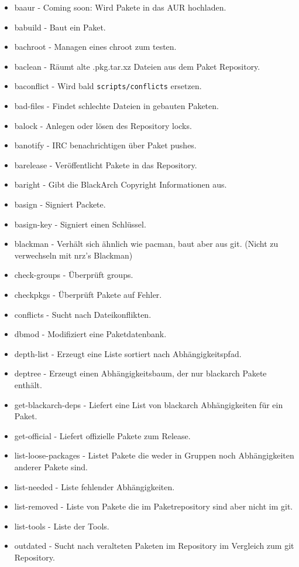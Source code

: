 \documentclass[a4paper, oneside, 11pt]{book}
\begin{document}
\begin{itemize}
\item baaur - Coming soon: Wird Pakete in das AUR hochladen.
\item babuild - Baut ein Paket.
\item bachroot - Managen eines chroot zum testen.
\item baclean - Räumt alte .pkg.tar.xz Dateien aus dem Paket Repository.
\item baconflict - Wird bald \verb|scripts/conflicts| ersetzen.
\item bad-files - Findet schlechte Dateien in gebauten Paketen.
\item balock - Anlegen oder lösen des Repository locks.
\item banotify - IRC benachrichtigen über Paket pushes.
\item barelease - Veröffentlicht Pakete in das Repository.
\item baright - Gibt die BlackArch Copyright Informationen aus.
\item basign - Signiert Packete.
\item basign-key - Signiert einen Schlüssel.
\item blackman - Verhält sich ähnlich wie pacman, baut aber aus git. 
	(Nicht zu verwechseln mit nrz's Blackman)
\item check-groups - Überprüft groups.
\item checkpkgs - Überprüft Pakete auf Fehler.
\item conflicts - Sucht nach Dateikonflikten.
\item dbmod - Modifiziert eine Paketdatenbank.
\item depth-list - Erzeugt eine Liste sortiert nach Abhängigkeitspfad.
\item deptree - Erzeugt einen Abhängigkeitsbaum, der nur blackarch Pakete enthält.
\item get-blackarch-deps - Liefert eine List von blackarch Abhängigkeiten für ein Paket.
\item get-official - Liefert offizielle Pakete zum Release.
\item list-loose-packages - Listet Pakete die weder in Gruppen noch Abhängigkeiten anderer Pakete sind.
\item list-needed - Liste fehlender Abhängigkeiten.
\item list-removed - Liste von Pakete die im Paketrepository sind aber nicht im git.
\item list-tools - Liste der Tools.
\item outdated - Sucht nach veralteten Paketen im Repository im Vergleich zum git Repository.

\end{itemize}
\end{document}
